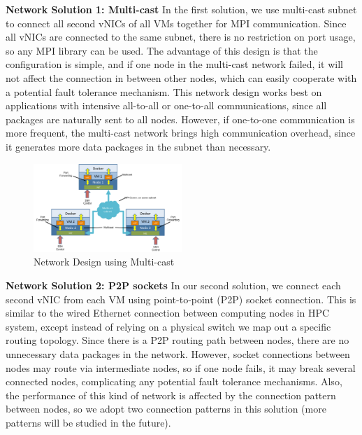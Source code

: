 \textbf{Network Solution 1: Multi-cast}
In the first solution, we use multi-cast subnet to connect all second vNICs of all VMs together for MPI communication. Since all vNICs are connected to the same subnet, there is no restriction on port usage, so any MPI library can be used. The advantage of this design is that the configuration is simple, and if one node in the multi-cast network failed, it will not affect the connection in between other nodes, which can easily cooperate with a potential fault tolerance mechanism. This network design works best on applications with intensive all-to-all or one-to-all communications, since all packages are naturally sent to all nodes. However, if one-to-one communication is more frequent, the multi-cast network brings high communication overhead, since it generates more data packages in the subnet than necessary. 

\begin{figure}[h]
    \centering
    \includegraphics[width=0.5\textwidth]{figures/mcast.pdf}
    \caption{Network Design using Multi-cast}
    \label{mcast}
\end{figure}

 
\textbf{Network Solution 2: P2P sockets}
In our second solution, we connect each second vNIC from each VM using point-to-point (P2P) socket connection. This is similar to the wired Ethernet connection between computing nodes in HPC system, except instead of relying on a physical switch we map out a specific routing topology. Since there is a P2P routing path between nodes, there are no unnecessary data packages in the network. However, socket connections between nodes may route via intermediate nodes, so if one node fails, it may break several connected nodes, complicating any potential fault tolerance mechanisms. Also, the performance of this kind of network is affected by the connection pattern between nodes, so we adopt two connection patterns in this solution (more patterns will be studied in the future).

